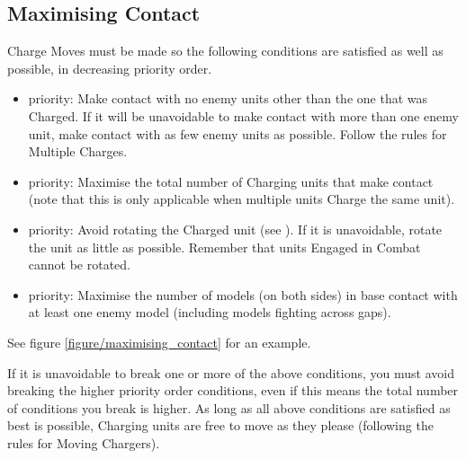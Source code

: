 \subsection{Maximising Contact}
\label{maximising_contact}

Charge Moves must be made so the following conditions are satisfied as well as possible, in decreasing priority order.

\begin{itemize}
	\item {} priority: Make contact with no enemy units other than the one that was Charged. If it will be unavoidable to make contact with more than one enemy unit, make contact with as few enemy units as possible. Follow the rules for Multiple Charges.
	\item {} priority: Maximise the total number of Charging units that make contact (note that this is only applicable when multiple units Charge the same unit).
	\item {} priority: Avoid rotating the Charged unit (see ). If it is unavoidable, rotate the unit as little as possible. Remember that units Engaged in Combat cannot be rotated.
	\item {} priority: Maximise the number of models (on both sides) in base contact with at least one enemy model (including models fighting across gaps).
\end{itemize}

See figure \ref{figure/maximising_contact} for an example.

If it is unavoidable to break one or more of the above conditions, you must avoid breaking the higher priority order conditions, even if this means the total number of conditions you break is higher. As long as all above conditions are satisfied as best is possible, Charging units are free to move as they please (following the rules for Moving Chargers).

\newcommand{\figMulChaA}{a)}
\newcommand{\figMulChaB}{b)}
\newcommand{\figMulChaOne}{1}
\newcommand{\figMulChaTwo}{2}
\newcommand{\figMulChaCharge}{\smallfontsize\flufffont{Charge!}}

